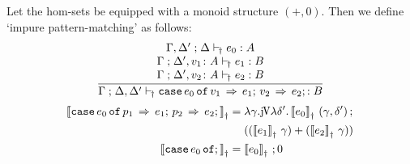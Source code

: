 \documentclass[runningheads,envcountsame]{llncs}
\begin{document}
Let the hom-sets be equipped with a monoid structure $(+, 0)$. Then we define ‘impure pattern-matching’ as follows:
\begin{gather}
    \dfrac{\begin{array}{c}
        \typeruled{\Gamma,\Delta'}{\Delta}{e_0}{j}{A} \\
        \typeruled{\Gamma}{\Delta', v_1\colon A}{e_1}{j}{B} \\
        \typeruled{\Gamma}{\Delta', v_2\colon A}{e_2}{j}{B}
    \end{array}}{
        \typeruled{\Gamma}{\Delta, \Delta'}{\ecaseof{e_0}{\ecase{v_1}{e_1} \ecase{v_2}{e_2}}}{j}{B}
    }
\end{gather}
\begin{align}
    \semD{\ecaseof{e_0}{\ecase{p_1}{e_1}
                        \ecase{p_2}{e_2}}} &=
         \elam{\gamma}{
        \comp{\juncurry{\elam{\delta'}{\eapp{\semD{e_0}}{(\gamma, \delta')}}}}{} \\
        & \mathrel{\phantom{=}} ((\eapp{\semD{e_1}}{\gamma}) + (\eapp{\semD{e_2}}{\gamma}))} \nonumber \\
    \semD{\ecaseof{e_0}{;}} &= \comp{\semD{e_0}}{0}
\end{align}
\end{document}
